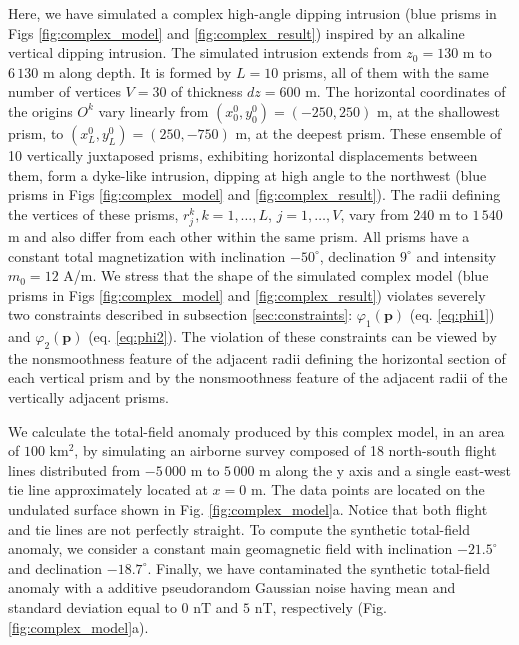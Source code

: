 Here, we have simulated a complex high-angle dipping intrusion (blue prisms in Figs \ref{fig:complex_model} and \ref{fig:complex_result}) inspired by an alkaline vertical dipping intrusion. 
The simulated intrusion extends from $z_0=130$ m to $6\,130$ m along depth.
It is formed by $ L = 10 $ prisms, all of them with the same number of vertices $ V = 30 $ of thickness $ dz = 600 $ m. 
The horizontal coordinates of the origins $ O^k $ vary linearly from $ (x_0^0, y_0^0) = (-250, 250) $ m, at the shallowest prism, to $ (x_L^0, y_L^0) = (250, -750) $ m, at the deepest prism. 
These ensemble of 10 vertically juxtaposed prisms, exhibiting horizontal displacements between them, form a dyke-like intrusion, dipping at high angle to the northwest (blue prisms in Figs \ref{fig:complex_model} and \ref{fig:complex_result}). 
The radii defining the vertices of these prisms, $ r^k_j, k = 1, \dots, L$, $j = 1,\dots, V$, 
vary from $ 240 $ m to $ 1\,540 $ m and also differ from each other within the same prism. 
All prisms have a constant total magnetization with inclination $ -50^\circ $, declination $ 9^\circ $ and intensity $ m_0 = 12 $ A/m. 
We stress that the shape of the simulated complex model (blue prisms in Figs \ref{fig:complex_model} and \ref{fig:complex_result}) violates severely two constraints described in subsection \ref{sec:constraints}: $\varphi_{1}(\mathbf{p})$ (eq. \ref{eq:phi1})
and $\varphi_{2}(\mathbf{p})$ (eq. \ref{eq:phi2}).
The violation of these constraints can be viewed by the nonsmoothness feature of the adjacent radii defining the horizontal section of each vertical prism and by the nonsmoothness feature of the adjacent radii of the vertically adjacent prisms.

We calculate the total-field anomaly produced by this complex model, in an area of $ 100 $ km$^2 $, by simulating an airborne survey composed of 18 north-south flight lines distributed from $ -5\,000 $ m to $ 5\,000 $ m along the y axis and a single east-west tie line approximately located at $ x = 0 $ m. 
The data points are located on the undulated surface shown in Fig. \ref{fig:complex_model}a. Notice that both flight and tie lines are not perfectly straight. 
To compute the synthetic total-field anomaly, we consider a constant main geomagnetic field with inclination $ -21.5^\circ $ and declination $ -18.7^\circ $. 
Finally, we have contaminated the synthetic total-field anomaly with a additive pseudorandom Gaussian noise having mean and standard deviation equal to $0$ nT and $5$ nT, respectively (Fig. \ref{fig:complex_model}a).

